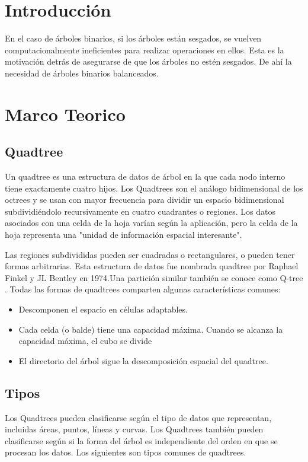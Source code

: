 \documentclass{article}
\begin{document}
    \section{Introducción}
    En el caso de árboles binarios, si los árboles están sesgados, se vuelven computacionalmente ineficientes para realizar operaciones en ellos.
    Esta es la motivación detrás de asegurarse de que los árboles no estén sesgados. De ahí la necesidad de árboles binarios balanceados.

    
\section{Marco Teorico}
\subsection{Quadtree}

Un quadtree es una estructura de datos de árbol en la que cada nodo interno tiene exactamente cuatro hijos. Los Quadtrees son el análogo bidimensional de los octrees y se usan con mayor frecuencia para dividir un espacio bidimensional subdividiéndolo recursivamente en cuatro cuadrantes o regiones. Los datos asociados con una celda de la hoja varían según la aplicación, pero la celda de la hoja representa una "unidad de información espacial interesante".

Las regiones subdivididas pueden ser cuadradas o rectangulares, o pueden tener formas arbitrarias. Esta estructura de datos fue nombrada quadtree por Raphael Finkel y JL Bentley en 1974.Una partición similar también se conoce como Q-tree . Todas las formas de quadtrees comparten algunas características comunes:

\begin{itemize}
    \item Descomponen el espacio en células adaptables.
    \item Cada celda (o balde) tiene una capacidad máxima. Cuando se alcanza la capacidad máxima, el cubo se divide
    \item El directorio del árbol sigue la descomposición espacial del quadtree.
\end{itemize}

\subsection{Tipos}

Los Quadtrees pueden clasificarse según el tipo de datos que representan, incluidas áreas, puntos, líneas y curvas. Los Quadtrees también pueden clasificarse según si la forma del árbol es independiente del orden en que se procesan los datos. Los siguientes son tipos comunes de quadtrees.
\end{document}
